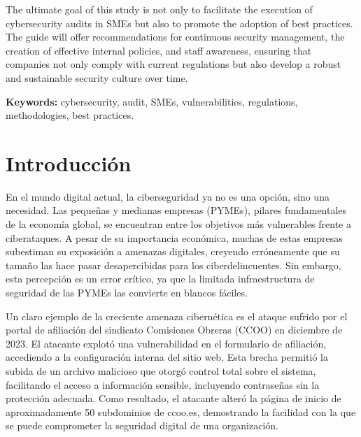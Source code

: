\documentclass[a4paper, 10pt]{article}
\begin{document}
The ultimate goal of this study is not only to facilitate the execution of cybersecurity audits in SMEs but also to promote the adoption of best practices. The guide will offer recommendations for continuous security management, the creation of effective internal policies, and staff awareness, ensuring that companies not only comply with current regulations but also develop a robust and sustainable security culture over time.

\par\vspace{0.5cm}
\textbf{Keywords:} cybersecurity, audit, SMEs, vulnerabilities, regulations, methodologies, best practices.
\clearpage



\section{Introducción}
En el mundo digital actual, la ciberseguridad ya no es una opción, sino una necesidad. Las pequeñas y medianas empresas (PYMEs), pilares fundamentales de la economía global, se encuentran entre los objetivos más vulnerables frente a ciberataques. A pesar de su importancia económica, muchas de estas empresas subestiman su exposición a amenazas digitales, creyendo erróneamente que su tamaño las hace pasar desapercibidas para los ciberdelincuentes. Sin embargo, esta percepción es un error crítico, ya que la limitada infraestructura de seguridad de las PYMEs las convierte en blancos fáciles.
\par\vspace{0.5cm}

Un claro ejemplo de la creciente amenaza cibernética es el ataque sufrido por el portal de afiliación del sindicato Comisiones Obreras (CCOO) en diciembre de 2023. El atacante explotó una vulnerabilidad en el formulario de afiliación, accediendo a la configuración interna del sitio web. Esta brecha permitió la subida de un archivo malicioso que otorgó control total sobre el sistema, facilitando el acceso a información sensible, incluyendo contraseñas sin la protección adecuada. Como resultado, el atacante alteró la página de inicio de aproximadamente 50 subdominios de ccoo.es, demostrando la facilidad con la que se puede comprometer la seguridad digital de una organización.
\par\vspace{0.5cm}
\end{document}
